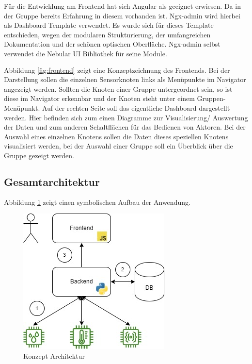 \documentclass[letterpaper, 10 pt, conference]{ieeeconf}  %
\begin{document}
Für die Entwicklung am Frontend hat sich Angular als geeignet erwiesen. Da in der Gruppe bereits Erfahrung in diesem vorhanden ist. 
Ngx-admin wird hierbei als Dashboard Template verwendet. 
Es wurde sich für dieses Template entschieden, wegen der modularen Strukturierung, der umfangreichen Dokumentation und der schönen optischen Oberfläche. 
Ngx-admin selbst verwendet die Nebular UI Bibliothek für seine Module.

Abbildung \ref{fig:frontend} zeigt eine Konzeptzeichnung des Frontends. 
Bei der Darstellung sollen die einzelnen Sensorknoten links als Menüpunkte im Navigator angezeigt werden. 
Sollten die Knoten einer Gruppe untergeordnet sein, so ist diese im Navigator erkennbar und der Knoten steht unter einem Gruppen-Menüpunkt. 
Auf der rechten Seite soll das eigentliche Dashboard dargestellt werden. 
Hier befinden sich zum einen Diagramme zur Visualisierung/ Auswertung der Daten und zum anderen Schaltflächen für das Bedienen von Aktoren. 
Bei der Auswahl eines einzelnen Knotens sollen die Daten dieses speziellen Knotens visualisiert werden, bei der Auswahl einer Gruppe soll ein Überblick über die Gruppe gezeigt werden.




\subsection{Gesamtarchitektur}
Abbildung \ref{fig:arch} zeigt einen symbolischen Aufbau der Anwendung.

\begin{figure}[thpb]
      \centering
      \includegraphics[scale=0.6]{abbildungen/arch.jpeg}
      \caption{Konzept Architektur}
      \label{fig:arch}
 \end{figure}


\addtolength{\textheight}{-10cm}   %
\end{document}
